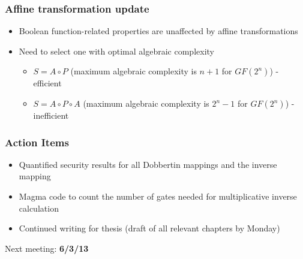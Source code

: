 \documentclass[handout]{beamer}
\begin{document}
\begin{frame}
	\frametitle{Affine transformation update}
	\begin{itemize}
		\item Boolean function-related properties are unaffected by affine transformations 
		\item Need to select one with optimal algebraic complexity
		\begin{itemize}
			\item $S = A \circ P$ (maximum algebraic complexity is $n + 1$ for $GF(2^n)$) - efficient
			\item $S = A \circ P \circ A$ (maximum algebraic complexity is $2^n - 1$ for $GF(2^n)$) - inefficient
		\end{itemize}
	\end{itemize}
\end{frame}


\begin{frame}
	\frametitle{Action Items}
	\begin{itemize}
		\item Quantified security results for all Dobbertin mappings and the inverse mapping
		\item Magma code to count the number of gates needed for multiplicative inverse calculation
		\item Continued writing for thesis (draft of all relevant chapters by Monday)
	\end{itemize}
	\begin{center}
		Next meeting: \textbf{6/3/13}
	\end{center}
\end{frame}
\end{document}
